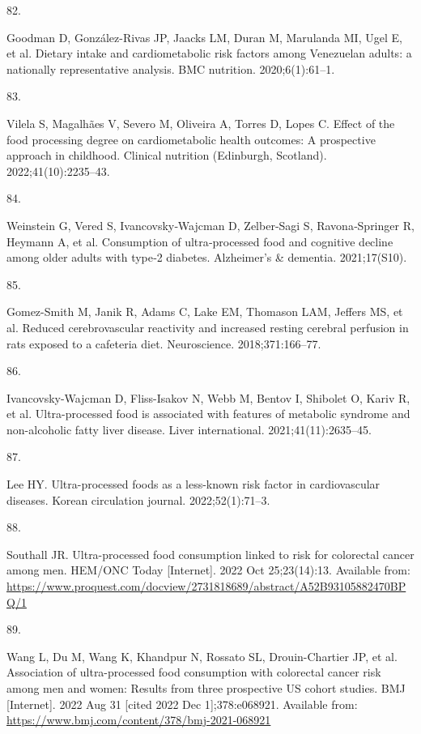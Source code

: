 \documentclass[
]{article}
\newlength{\cslhangindent}
\newlength{\csllabelwidth}
\newlength{\cslentryspacingunit} %
\newenvironment{CSLReferences}[2] %
 {%
  \setlength{\parindent}{0pt}
  \ifodd #1
  \let\oldpar\par
  \def\par{\hangindent=\cslhangindent\oldpar}
  \fi
  \setlength{\parskip}{#2\cslentryspacingunit}
 }%
 {}
\newcommand{\CSLLeftMargin}[1]{\parbox[t]{\csllabelwidth}{#1}}
\newcommand{\CSLRightInline}[1]{\parbox[t]{\linewidth - \csllabelwidth}{#1}\break}
\begin{document}
\begin{CSLReferences}{0}{0}
\leavevmode{}%
\CSLLeftMargin{82. }%
\CSLRightInline{Goodman D, González-Rivas JP, Jaacks LM, Duran M,
Marulanda MI, Ugel E, et al. Dietary intake and cardiometabolic risk
factors among Venezuelan adults: a nationally representative analysis.
BMC nutrition. 2020;6(1):61--1. }

\leavevmode{}%
\CSLLeftMargin{83. }%
\CSLRightInline{Vilela S, Magalhães V, Severo M, Oliveira A, Torres D,
Lopes C. Effect of the food processing degree on cardiometabolic health
outcomes: {A} prospective approach in childhood. Clinical nutrition
(Edinburgh, Scotland). 2022;41(10):2235--43. }

\leavevmode{}%
\CSLLeftMargin{84. }%
\CSLRightInline{Weinstein G, Vered S, Ivancovsky‐Wajcman D, Zelber‐Sagi
S, Ravona‐Springer R, Heymann A, et al. Consumption of ultra‐processed
food and cognitive decline among older adults with type‐2 diabetes.
Alzheimer's \& dementia. 2021;17(S10). }

\leavevmode{}%
\CSLLeftMargin{85. }%
\CSLRightInline{Gomez-Smith M, Janik R, Adams C, Lake EM, Thomason LAM,
Jeffers MS, et al. Reduced cerebrovascular reactivity and increased
resting cerebral perfusion in rats exposed to a cafeteria diet.
Neuroscience. 2018;371:166--77. }

\leavevmode{}%
\CSLLeftMargin{86. }%
\CSLRightInline{Ivancovsky-Wajcman D, Fliss-Isakov N, Webb M, Bentov I,
Shibolet O, Kariv R, et al. Ultra{-}processed food is associated with
features of metabolic syndrome and non{-}alcoholic fatty liver disease.
Liver international. 2021;41(11):2635--45. }

\leavevmode{}%
\CSLLeftMargin{87. }%
\CSLRightInline{Lee HY. Ultra-processed foods as a less-known risk
factor in cardiovascular diseases. Korean circulation journal.
2022;52(1):71--3. }

\leavevmode{}%
\CSLLeftMargin{88. }%
\CSLRightInline{Southall JR. Ultra-processed food consumption linked to
risk for colorectal cancer among men. HEM/ONC Today {[}Internet{]}. 2022
Oct 25;23(14):13. Available from:
\url{https://www.proquest.com/docview/2731818689/abstract/A52B93105882470BPQ/1}}

\leavevmode{}%
\CSLLeftMargin{89. }%
\CSLRightInline{Wang L, Du M, Wang K, Khandpur N, Rossato SL,
Drouin-Chartier JP, et al. Association of ultra-processed food
consumption with colorectal cancer risk among men and women: Results
from three prospective {US} cohort studies. BMJ {[}Internet{]}. 2022 Aug
31 {[}cited 2022 Dec 1{]};378:e068921. Available from:
\url{https://www.bmj.com/content/378/bmj-2021-068921}}


\end{CSLReferences}
\end{document}

